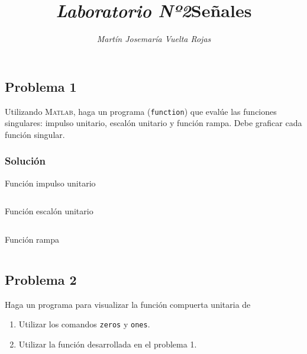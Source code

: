 \documentclass[a4paper,12pt,final]{article}
\begin{document}
  \title{\textit{\Large Laboratorio Nº2}\linebreak{}\linebreak{}\textbf{\Huge Señales}}
  \author{\emph{Martín Josemaría Vuelta Rojas}}
  \maketitle

  \subsection*{Problema 1}
    \noindent Utilizando \textsc{Matlab}, haga un programa (\texttt{function})
    que evalúe las funciones singulares: impulso unitario, escalón unitario
    y función rampa. Debe graficar cada función singular.

    \subsubsection*{Solución}
      \begin{listing}[H]
        \caption{Función impulso unitario}
        \label{script01A}
        \inputminted{matlab}{./laboratorio_2/impulso.m}
      \end{listing}

      \begin{listing}[H]
        \caption{Función escalón unitario}
        \label{script01B}
        \inputminted{matlab}{./laboratorio_2/escalon.m}
      \end{listing}

      \begin{listing}[H]
        \caption{Función rampa}
        \label{script01C}
        \inputminted{matlab}{./laboratorio_2/rampa.m}
      \end{listing}

      \vspace{\fill}

  \newpage
  \subsection*{Problema 2}
    \noindent Haga un programa para visualizar la función compuerta unitaria de
    \begin{enumerate}
      \item Utilizar los comandos \texttt{zeros} y \texttt{ones}.
      \item Utilizar la función desarrollada en el problema 1.
    \end{enumerate}
\end{document}
